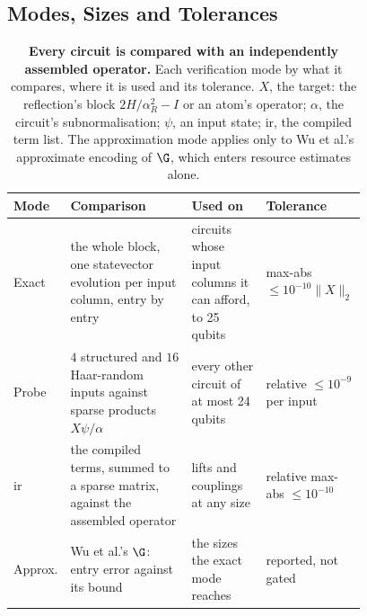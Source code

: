\subsection{Modes, Sizes and Tolerances}
\label{app:verification-modes}

\begin{table}[htbp]
    \centering
    \caption[Operator verification modes and their tolerances]{\textbf{Every circuit is compared with an independently assembled operator.} Each verification mode by what it compares, where it is used and its tolerance. $X$, the target: the reflection's block $2H/\alpha_R^2-I$ or an atom's operator; $\alpha$, the circuit's subnormalisation; $\psi$, an input state; \gls{ir}, the compiled term list. The approximation mode applies only to Wu et al.'s approximate encoding of $\G$, which enters resource estimates alone.}
    \label{tab:verification-modes}
    \small
    \begin{tabular}{@{}l p{0.37\linewidth} p{0.22\linewidth} p{0.19\linewidth}@{}}
        \toprule
        Mode & Comparison & Used on & Tolerance \\
        \midrule
        Exact & the whole block, one statevector evolution per input column, entry by entry & circuits whose input columns it can afford, to 25 qubits & max-abs $\le10^{-10}\|X\|_2$ \\
        Probe & $4$ structured and $16$ Haar-random inputs against sparse products $X\psi/\alpha$ & every other circuit of at most 24 qubits & relative $\le10^{-9}$ per input \\
        \gls{ir} & the compiled terms, summed to a sparse matrix, against the assembled operator & lifts and couplings at any size & relative max-abs $\le10^{-10}$ \\
        Approx. & Wu et al.'s $\G$: entry error against its bound & the sizes the exact mode reaches & reported, not gated \\
        \bottomrule
    \end{tabular}
\end{table}

